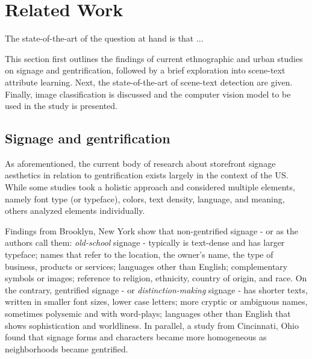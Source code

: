 \section{Related Work}
\label{sec:related_work}

The state-of-the-art of the question at hand is that ...

This section first outlines the findings of current ethnographic and urban studies on signage and gentrification, followed by a brief exploration into scene-text attribute learning. Next, the state-of-the-art of scene-text detection are given. Finally, image classification is discussed and the computer vision model to be used in the study is presented.


\subsection{Signage and gentrification}

As aforementioned, the current body of research about storefront signage aesthetics in relation to gentrification exists largely in the context of the US. While some studies took a holistic approach and considered multiple elements, namely font type (or typeface), colors, text density, language, and meaning, others analyzed elements individually.

Findings from Brooklyn, New York\cite{trinch_signsays_2017, snajdr_oldschool_2018, snajdr_preserve_2022} show that non-gentrified signage - or as the authors call them: \textit{old-school} signage - typically is text-dense and has larger typeface; names that refer to the location, the owner's name, the type of business, products or services; languages other than English; complementary symbols or images; reference to religion, ethnicity, country of origin, and race. On the contrary, gentrified signage - or \textit{distinction-making} signage - has shorter texts, written in smaller font sizes, lower case letters; more cryptic or ambiguous names, sometimes polysemic and with word-plays; languages other than English that shows sophistication and worldliness. In parallel, a study from Cincinnati, Ohio \cite{rahman_signage_2020} found that signage forms and characters became more homogeneous as neighborhoods became gentrified.

